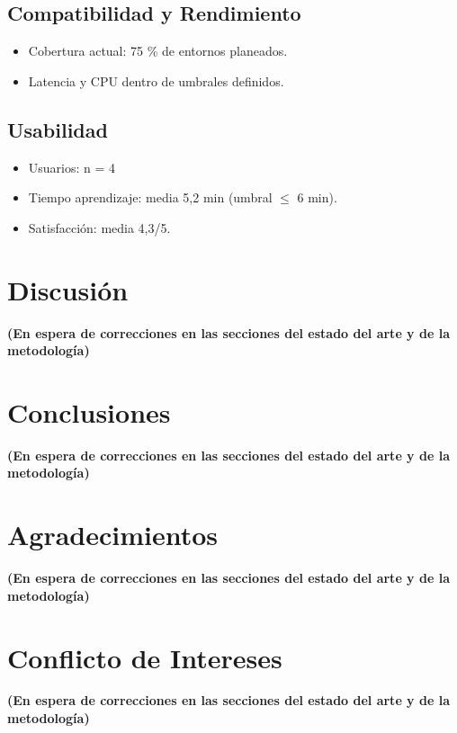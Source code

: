 \documentclass[12pt]{article}
\begin{document}
\subsection{Compatibilidad y Rendimiento}
\begin{itemize}
    \item Cobertura actual: 75 \% de entornos planeados.
    \item Latencia y CPU dentro de umbrales definidos.
\end{itemize}

\subsection{Usabilidad}
\begin{itemize}
    \item Usuarios: n = 4
    \item Tiempo aprendizaje: media 5,2 min (umbral $\leq$ 6 min).
    \item Satisfacción: media 4,3/5.
\end{itemize}

\section{Discusión}
\textbf{(En espera de correcciones en las secciones del estado del arte y de la metodología)}

\section{Conclusiones}
\textbf{(En espera de correcciones en las secciones del estado del arte y de la metodología)}

\section{Agradecimientos}
\textbf{(En espera de correcciones en las secciones del estado del arte y de la metodología)}

\section{Conflicto de Intereses}
\textbf{(En espera de correcciones en las secciones del estado del arte y de la metodología)}
\end{document}
